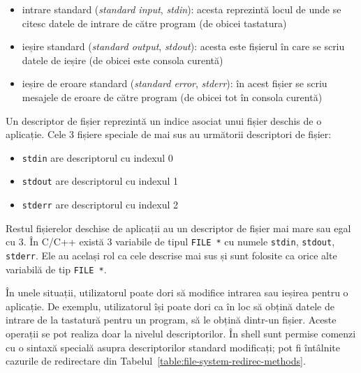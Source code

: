 \begin{itemize}
  \item intrare standard (\textit{standard input}, \textit{stdin}): acesta reprezintă locul de unde
		se citesc datele de intrare de către program (de obicei
		tastatura)
  \item ieșire standard (\textit{standard output}, \textit{stdout}): acesta este fișierul în care se
		scriu datele de ieșire (de obicei este consola curentă)
  \item ieșire de eroare standard (\textit{standard error}, \textit{stderr}): în acest fișier se scriu
		mesajele de eroare de către program (de obicei tot în consola
		curentă)
\end{itemize}

Un descriptor de fișier reprezintă un indice asociat unui fișier deschis de o
aplicație. Cele 3 fișiere speciale de mai sus au următorii descriptori de
fișier:

\begin{itemize}
  \item \texttt{stdin} are descriptorul cu indexul 0
  \item \texttt{stdout} are descriptorul cu indexul 1
  \item \texttt{stderr} are descriptorul cu indexul 2
\end{itemize}

Restul fișierelor deschise de aplicații au un descriptor de fișier mai mare sau
egal cu 3. În C/C++ există 3 variabile de tipul \texttt{FILE *} cu numele \texttt{stdin}, \texttt{stdout}, \texttt{stderr}.
Ele au același rol ca cele descrise mai sus și sunt folosite ca orice alte
variabilă de tip \texttt{FILE *}.

În unele situații, utilizatorul poate dori să modifice intrarea sau ieșirea
pentru o aplicație. De exemplu, utilizatorul își poate dori ca în loc să obțină
datele de intrare de la tastatură pentru un program, să le obțină dintr-un
fișier. Aceste operații se pot realiza doar la nivelul descriptorilor. În
shell sunt permise comenzi cu o sintaxă specială asupra descriptorilor
standard modificați; pot fi întâlnite cazurile de redirectare din Tabelul~\ref{table:file-system-redirec-methods}.

